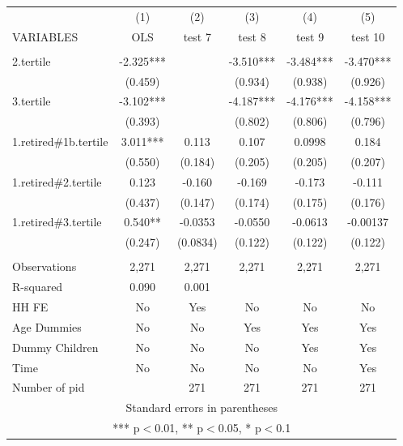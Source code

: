\begin{tabular}{lccccc} \hline
 & (1) & (2) & (3) & (4) & (5) \\
VARIABLES & OLS & test 7 & test 8 & test 9 & test 10 \\ \hline
 &  &  &  &  &  \\
2.tertile & -2.325*** &  & -3.510*** & -3.484*** & -3.470*** \\
 & (0.459) &  & (0.934) & (0.938) & (0.926) \\
3.tertile & -3.102*** &  & -4.187*** & -4.176*** & -4.158*** \\
 & (0.393) &  & (0.802) & (0.806) & (0.796) \\
1.retired\#1b.tertile & 3.011*** & 0.113 & 0.107 & 0.0998 & 0.184 \\
 & (0.550) & (0.184) & (0.205) & (0.205) & (0.207) \\
1.retired\#2.tertile & 0.123 & -0.160 & -0.169 & -0.173 & -0.111 \\
 & (0.437) & (0.147) & (0.174) & (0.175) & (0.176) \\
1.retired\#3.tertile & 0.540** & -0.0353 & -0.0550 & -0.0613 & -0.00137 \\
 & (0.247) & (0.0834) & (0.122) & (0.122) & (0.122) \\
 &  &  &  &  &  \\
Observations & 2,271 & 2,271 & 2,271 & 2,271 & 2,271 \\
R-squared & 0.090 & 0.001 &  &  &  \\
HH FE & No & Yes & No & No & No \\
Age Dummies & No & No & Yes & Yes & Yes \\
Dummy Children & No & No & No & Yes & Yes \\
Time & No & No & No & No & Yes \\
 Number of pid &  & 271 & 271 & 271 & 271 \\ \hline
\multicolumn{6}{c}{ Standard errors in parentheses} \\
\multicolumn{6}{c}{ *** p$<$0.01, ** p$<$0.05, * p$<$0.1} \\
\end{tabular}

